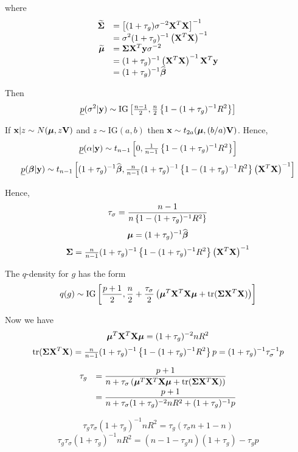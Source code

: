 \documentclass{article}[12pt]
\begin{document}
\noindent where
$$
\begin{array}{rl}
\displaystyle \widetilde{{\boldsymbol \Sigma}} 
& \displaystyle = \left[ (1 + \tau_g)\sigma^{-2} {\bf X}^T{\bf X} \right]^{-1} 
\\
& \displaystyle = \sigma^2 (1 + \tau_g)^{-1} \left( {\bf X}^T{\bf X} \right)^{-1}
\\
\displaystyle \widetilde{{\boldsymbol \mu}} 
& \displaystyle = {\boldsymbol \Sigma}{\bf X}^T{\bf y}\sigma^{-2} 
\\
& \displaystyle = (1 + \tau_g)^{-1} \left( {\bf X}^T{\bf X} \right)^{-1}{\bf X}^T{\bf y} 
\\
& \displaystyle = (1 + \tau_g)^{-1}\widehat{{\boldsymbol \beta}}
\end{array}
$$

\noindent Then
$$
\underline{p}(\sigma^2|{\bf y}) \sim \mbox{IG}\left[
\tfrac{n-1}{2},
\tfrac{n}{2} \left\{ 1 - (1 + \tau_g)^{-1}  R^2
\right\}
\right]
$$

\noindent 
If ${\bf x}|z \sim N({\boldsymbol \mu},z{\bf V})$ and $z\sim \mbox{IG}(a,b)$ then
${\bf x} \sim t_{2a}( {\boldsymbol \mu}, (b/a){\bf V})$. 
Hence,
$$
\displaystyle \underline{p}(\alpha|{\bf y}) \sim t_{n-1}\left[ 0, \tfrac{1}{n-1} \left\{ 1 - (1 + \tau_g)^{-1}  R^2
\right\}
\right]
$$
$$
\displaystyle \underline{p}({\boldsymbol \beta}|{\bf y}) \sim t_{n-1}\left[
(1 + \tau_g)^{-1}\widehat{{\boldsymbol \beta}},
\tfrac{n}{n-1} (1 + \tau_g)^{-1} \left\{ 1 - (1 + \tau_g)^{-1}  R^2 \right\}  \left( {\bf X}^T{\bf X} \right)^{-1}
\right]
$$

\noindent Hence,
$$
\displaystyle \tau_\sigma = \frac{n-1}{n \left\{ 1 - (1 + \tau_g)^{-1}  R^2 \right\}}
$$
$$
{\boldsymbol \mu} = (1 + \tau_g)^{-1}\widehat{{\boldsymbol \beta}}
$$
$$
{\boldsymbol \Sigma} = \tfrac{n}{n-1} (1 + \tau_g)^{-1} \left\{ 1 - (1 + \tau_g)^{-1}  R^2 \right\}  \left( {\bf X}^T{\bf X} \right)^{-1}
$$

\noindent The $q$-density for $g$ has the form
$$
q(g) \sim \mbox{IG}\left[
\frac{p+1}{2}, 
\frac{n}{2} + \frac{\tau_\sigma}{2}\left( {\boldsymbol \mu}^T{\bf X}^T{\bf X}{\boldsymbol \mu} + \mbox{tr}({\boldsymbol \Sigma}{\bf X}^T{\bf X}) 
\right)
\right]
$$

\noindent Now we have
$$
{\boldsymbol \mu}^T{\bf X}^T{\bf X}{\boldsymbol \mu} = (1 + \tau_g)^{-2} nR^2
$$
$$
\mbox{tr}({\boldsymbol \Sigma}{\bf X}^T{\bf X})  = 
\tfrac{n}{n-1} (1 + \tau_g)^{-1} \left\{ 1 - (1 + \tau_g)^{-1}  R^2 \right\} p = (1 + \tau_g)^{-1} \tau_\sigma^{-1} p
$$

$$
\begin{array}{rl}
\displaystyle \tau_g 
& \displaystyle = \frac{p+1}{n + \tau_\sigma\left( {\boldsymbol \mu}^T{\bf X}^T{\bf X}{\boldsymbol \mu} + \mbox{tr}({\boldsymbol \Sigma}{\bf X}^T{\bf X}) \right) }
\\ [2ex]
& \displaystyle = \frac{p+1}{n + \tau_\sigma (1 + \tau_g)^{-2} nR^2 + (1 + \tau_g)^{-1} p }
\end{array}
$$


$$
\tau_g\tau_\sigma (1 + \tau_g)^{-1} nR^2 = \tau_g(\tau_\sigma n  + 1 - n) 
$$
$$
 \tau_g \tau_\sigma (1 + \tau_g)^{-1} nR^2    = (n - 1 - \tau_g n)(1 + \tau_g) - \tau_g p
$$
\end{document}
